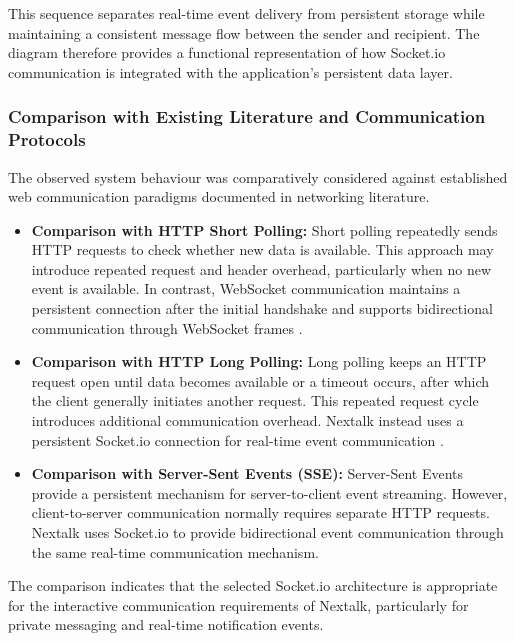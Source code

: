 \documentclass[12pt, a4paper]{article}
\begin{document}
This sequence separates real-time event delivery from persistent storage while maintaining a consistent message flow between the sender and recipient. The diagram therefore provides a functional representation of how Socket.io communication is integrated with the application's persistent data layer.

\subsubsection{Comparison with Existing Literature and Communication Protocols}

The observed system behaviour was comparatively considered against established web communication paradigms documented in networking literature.

\begin{itemize}

    \item
    \textbf{Comparison with HTTP Short Polling:}
    Short polling repeatedly sends HTTP requests to check whether new data is available. This approach may introduce repeated request and header overhead, particularly when no new event is available. In contrast, WebSocket communication maintains a persistent connection after the initial handshake and supports bidirectional communication through WebSocket frames \cite{rfc7230,rfc6455}.

    \item
    \textbf{Comparison with HTTP Long Polling:}
    Long polling keeps an HTTP request open until data becomes available or a timeout occurs, after which the client generally initiates another request. This repeated request cycle introduces additional communication overhead. Nextalk instead uses a persistent Socket.io connection for real-time event communication \cite{rfc6202}.

    \item
    \textbf{Comparison with Server-Sent Events (SSE):}
    Server-Sent Events provide a persistent mechanism for server-to-client event streaming. However, client-to-server communication normally requires separate HTTP requests. Nextalk uses Socket.io to provide bidirectional event communication through the same real-time communication mechanism.

\end{itemize}

The comparison indicates that the selected Socket.io architecture is appropriate for the interactive communication requirements of Nextalk, particularly for private messaging and real-time notification events.
\end{document}
